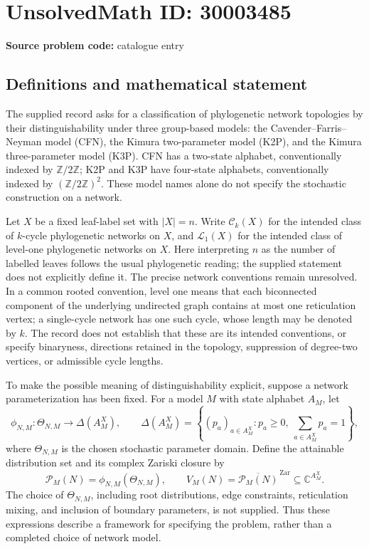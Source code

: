 \documentclass[11pt]{article}
\newcommand{\Z}{\mathbb{Z}}
\newcommand{\C}{\mathbb{C}}
\begin{document}
\section*{UnsolvedMath ID: 30003485}
\textbf{Source problem code:} catalogue entry
\subsection{Definitions and mathematical statement}
The supplied record asks for a classification of phylogenetic network topologies by their distinguishability under three group-based models: the Cavender--Farris--Neyman model (CFN), the Kimura two-parameter model (K2P), and the Kimura three-parameter model (K3P). CFN has a two-state alphabet, conventionally indexed by \(\Z/2\Z\); K2P and K3P have four-state alphabets, conventionally indexed by \((\Z/2\Z)^2\). These model names alone do not specify the stochastic construction on a network.

Let \(X\) be a fixed leaf-label set with \(|X|=n\). Write \(\mathcal C_k(X)\) for the intended class of \(k\)-cycle phylogenetic networks on \(X\), and \(\mathcal L_1(X)\) for the intended class of level-one phylogenetic networks on \(X\). Here interpreting \(n\) as the number of labelled leaves follows the usual phylogenetic reading; the supplied statement does not explicitly define it. The precise network conventions remain unresolved. In a common rooted convention, level one means that each biconnected component of the underlying undirected graph contains at most one reticulation vertex; a single-cycle network has one such cycle, whose length may be denoted by \(k\). The record does not establish that these are its intended conventions, or specify binaryness, directions retained in the topology, suppression of degree-two vertices, or admissible cycle lengths.

To make the possible meaning of distinguishability explicit, suppose a network parameterization has been fixed. For a model \(M\) with state alphabet \(A_M\), let
\[
\phi_{N,M}\colon\Theta_{N,M}\longrightarrow\Delta(A_M^X),\qquad
\Delta(A_M^X)=\left\{(p_a)_{a\in A_M^X}:p_a\geq0,\ \sum_{a\in A_M^X}p_a=1\right\},
\]
where \(\Theta_{N,M}\) is the chosen stochastic parameter domain. Define the attainable distribution set and its complex Zariski closure by
\[
\mathcal P_M(N)=\phi_{N,M}(\Theta_{N,M}),\qquad
V_M(N)=\overline{\mathcal P_M(N)}^{\,\mathrm{Zar}}\subseteq\C^{A_M^X}.
\]
The choice of \(\Theta_{N,M}\), including root distributions, edge constraints, reticulation mixing, and inclusion of boundary parameters, is not supplied. Thus these expressions describe a framework for specifying the problem, rather than a completed choice of network model.
\end{document}
